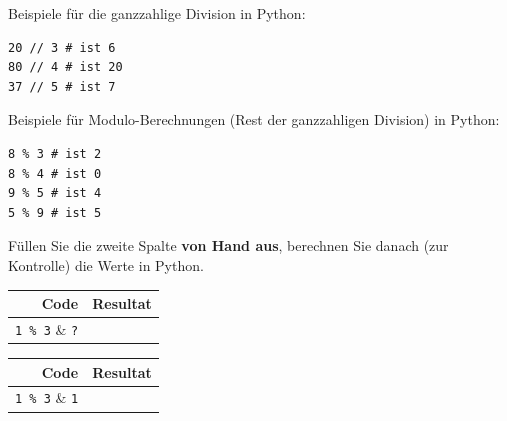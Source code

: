 \begin{myexample}
Beispiele für die ganzzahlige Division in Python:
\begin{lstlisting}
20 // 3 # ist 6
80 // 4 # ist 20
37 // 5 # ist 7
\end{lstlisting}
\end{myexample}

\begin{myexample}
Beispiele für Modulo-Berechnungen (Rest der ganzzahligen Division) in Python:
\begin{lstlisting}
8 % 3 # ist 2
8 % 4 # ist 0
9 % 5 # ist 4
5 % 9 # ist 5
\end{lstlisting}
\end{myexample}

\begin{myexercise}\label{ex:modulo}
	Füllen Sie die zweite Spalte \textbf{von Hand aus}, berechnen Sie danach (zur Kontrolle) die Werte in Python.
	\begin{table}[H]
		\centering
		\begin{tabular}{r|c}
			\textbf{Code}     & \textbf{Resultat} \\\midrule\midrule
			\lstinline|1 % 3| & \lstinline|?|     \\\midrule
			\lstinline|2 % 3| & \lstinline|?|     \\\midrule
			\lstinline|3 % 3| & \lstinline|?|     \\\midrule
			\lstinline|4 % 3| & \lstinline|?|     \\\midrule
			\lstinline|5 % 3| & \lstinline|?|     \\\midrule
			\lstinline|6 % 3| & \lstinline|?|     \\\midrule
		\end{tabular}
	\end{table}
	\begin{myanswer}
		\begin{table}[H]
			\centering
			\begin{tabular}{r|c}
				\textbf{Code}     & \textbf{Resultat} \\\midrule\midrule
				\lstinline|1 % 3| & \lstinline|1|     \\\midrule
				\lstinline|2 % 3| & \lstinline|2|     \\\midrule
				\lstinline|3 % 3| & \lstinline|0|     \\\midrule
				\lstinline|4 % 3| & \lstinline|1|     \\\midrule
				\lstinline|5 % 3| & \lstinline|2|     \\\midrule
				\lstinline|6 % 3| & \lstinline|0|     \\\midrule
			\end{tabular}
		\end{table}
	\end{myanswer}
\end{myexercise}

